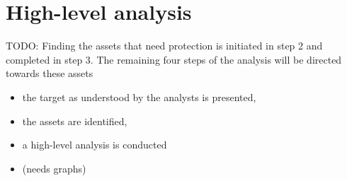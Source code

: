 \section{High-level analysis}

TODO:
Finding the assets that need protection is
initiated in step 2 and completed in step 3. The remaining
four steps of the analysis will be directed towards these
assets

\begin{itemize}
    \item the target as understood by the analysts is presented,
    \item the assets are identified,
    \item a high-level analysis is conducted
    \item (needs graphs)
\end{itemize}